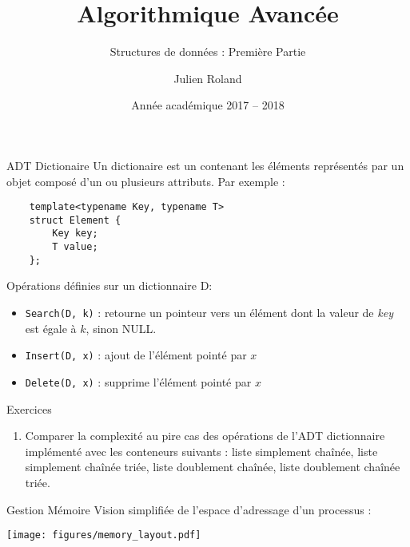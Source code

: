 \documentclass[handout]{beamer}
\title{Algorithmique Avancée}
\subtitle{Structures de données : Première Partie}
\date{Année académique 2017 -- 2018}
\author{Julien Roland}
\let\emph\relax %
\begin{document}
\lstset{language=c++, basicstyle=\small, columns=fullflexible}
    
    
\maketitle

\begin{frame}[fragile]{ADT Dictionaire} 
	Un dictionaire est un \emph{ensemble dynamique} contenant les éléments représentés par un objet composé d'un ou plusieurs attributs. Par exemple :
	\begin{lstlisting}
    template<typename Key, typename T>
    struct Element {
        Key key;
        T value;
    };
	\end{lstlisting}
	Opérations définies sur un dictionnaire D:
	\begin{itemize}
		\item \lstinline{Search(D, k)} : retourne un pointeur vers un élément dont la valeur de \textit{key} est égale à $k$, sinon NULL.
		\item \lstinline{Insert(D, x)} : ajout de l'élément pointé par $x$
		\item \lstinline{Delete(D, x)} : supprime l'élément pointé par $x$
	\end{itemize}
\end{frame}

\begin{frame}[fragile]{Exercices}
	\begin{enumerate}
		\item Comparer la complexité au pire cas des opérations de l'ADT dictionnaire implémenté avec les conteneurs suivants : liste simplement chaînée, liste simplement chaînée triée, liste doublement chaînée, liste doublement chaînée triée.
	\end{enumerate}
\end{frame}

\begin{frame}[t]{Gestion Mémoire}
	Vision simplifiée de l'espace d'adressage d'un processus :
	\begin{center}
		\texttt{[image: figures/memory\_layout.pdf]}
	\end{center}
\end{frame}
\end{document}
